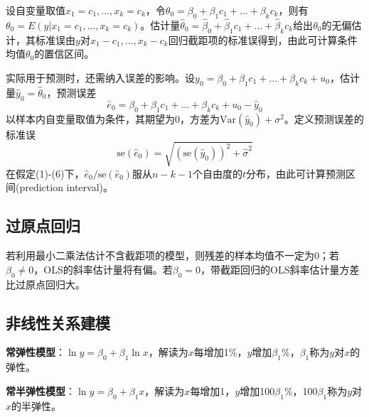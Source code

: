 \par 设自变量取值$x_1=c_1,\dots,x_k=c_k$，令$\theta_0=\beta_0+\beta_1 c_1+\dots+\beta_k c_k$，则有$\theta_0=E(y\vert x_1=c_1,\dots,x_k=c_k)$。估计量$\hat{\theta}_0=\hat{\beta}_0+\hat{\beta}_1 c_1+\dots+\hat{\beta}_k c_k$给出$\theta_0$的无偏估计，其标准误由$y$对$x_1-c_1,\dots,x_k-c_k$回归截距项的标准误得到，由此可计算条件均值$\theta_0$的置信区间。

\par 实际用于预测时，还需纳入误差的影响。设$y_0=\beta_0+\beta_1 c_1+\dots+\beta_k c_k+u_0$，估计量$\hat{y}_0=\hat{\theta}_0$，预测误差
\begin{equation}
    \hat{e}_0=\beta_0+\beta_1 c_1+\dots+\beta_k c_k+u_0-\hat{y}_0
\end{equation}
以样本内自变量取值为条件，其期望为0，方差为$\text{Var}(\hat{y}_0)+\sigma^2$。定义预测误差的标准误
\begin{equation}
    \text{se}(\hat{e}_0)=\sqrt{(\text{se}(\hat{y}_0))^2+\hat{\sigma}^2}
\label{eq:pred_interval_se}
\end{equation}
在假定(1)-(6)下，$\hat{e}_0/\text{se}(\hat{e}_0)$服从$n-k-1$个自由度的$t$分布，由此可计算预测区间(prediction interval)。

\subsection{过原点回归}
\par 若利用最小二乘法估计不含截距项的模型，则残差的样本均值不一定为0；若$\beta_0\neq 0$，OLS的斜率估计量将有偏。若$\beta_0=0$，带截距回归的OLS斜率估计量方差比过原点回归大。

\subsection{非线性关系建模}
\par \textbf{常弹性模型}：$\ln y=\beta_0+\beta_1 \ln x$，解读为$x$每增加1\%，$y$增加$\beta_1$\%，$\beta_1$称为$y$对$x$的弹性。

\par \textbf{常半弹性模型}：$\ln y=\beta_0+\beta_1 x$，解读为$x$每增加1，$y$增加100$\beta_1$\%，100$\beta_1$称为$y$对$x$的半弹性。

